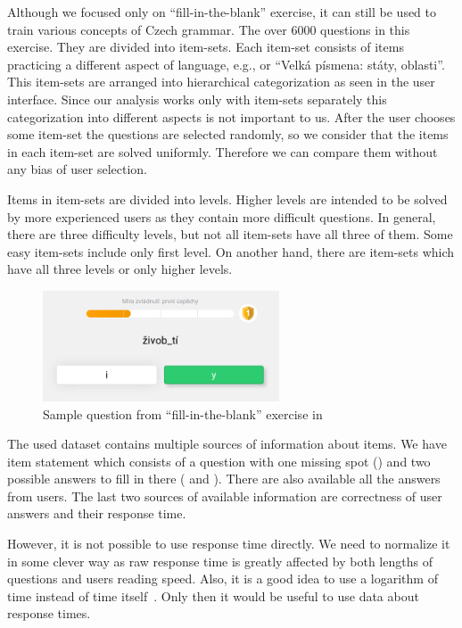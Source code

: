 \documentclass[
  printed, %
  table,   %
  nolof,     %
  nolot,     %
  color,
  final,
  nocover
]{fithesis3}
\begin{document}
Although we focused only on ``fill-in-the-blank'' exercise, it can still be used to train various concepts of Czech grammar. The over 6000 questions in this exercise. They are divided into item-sets. Each item-set consists of items practicing a different aspect of language, e.g., \cviceniB{} or ``Velká písmena: státy, oblasti''. This item-sets are arranged into hierarchical categorization as seen in the user interface. Since our analysis works only with item-sets separately this categorization into different aspects is not important to us. After the user chooses some item-set the questions are selected randomly, so we consider that the items in each item-set are solved uniformly. Therefore we can compare them without any bias of user selection.

Items in item-sets are divided into levels. Higher levels are intended to be solved by more experienced users as they contain more difficult questions. In general, there are three difficulty levels, but not all item-sets have all three of them. Some easy item-sets include only first level. On another hand, there are item-sets which have all three levels or only higher levels.

\begin{figure}
  \includegraphics[width=7cm]{img/umimecesky_doplnovacka}
  \caption{Sample question from ``fill-in-the-blank'' exercise in \umimeCesky{}}
  \label{fig:umimecesky_doplnovacka}
\end{figure}


The used dataset contains multiple sources of information about items. We have item statement which consists of a question with one missing spot () and two possible answers to fill in there ( and ). There are also available all the answers from users. The last two sources of available information are correctness of user answers and their response time.

However, it is not possible to use response time directly. We need to normalize it in some clever way as raw response time is greatly affected by both lengths of questions and users reading speed. Also, it is a good idea to use a logarithm of time instead of time itself~\cite{niznan2014using}. Only then it would be useful to use data about response times.
\end{document}
